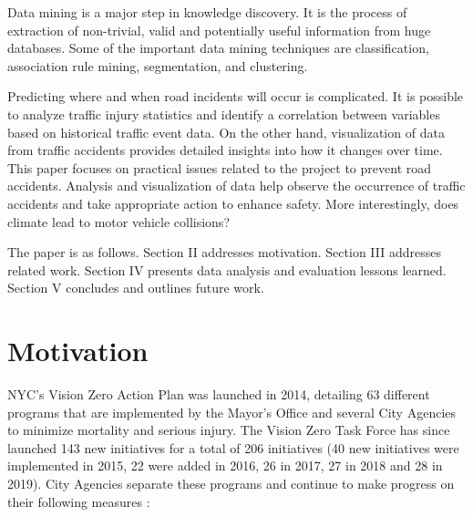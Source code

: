 \documentclass[conference]{IEEEtran}
\begin{document}
Data mining is a major step in knowledge discovery.  It is the process of extraction of non-trivial, valid and potentially useful information from huge databases. Some of the important data mining techniques are classification, association rule mining, segmentation, and clustering. 

Predicting where and when road incidents will occur is complicated. It is possible to analyze traffic injury statistics and identify a correlation between variables based on historical traffic event data. On the other hand, visualization of data from traffic accidents provides detailed insights into how it changes over time. This paper focuses on practical issues related to the project to prevent road accidents. Analysis and visualization of data help observe the occurrence of traffic accidents and take appropriate action to enhance safety.  More interestingly, does climate lead to motor vehicle collisions? 

The paper is as follows. Section II addresses motivation. Section III addresses related work. Section IV presents data analysis and evaluation lessons learned. Section V concludes and outlines future work. 

\section{Motivation}
NYC’s Vision Zero Action Plan was launched in 2014, detailing 63 different programs that are implemented by the Mayor's Office and several City Agencies to minimize mortality and serious injury. The Vision Zero Task Force has since launched 143 new initiatives for a total of 206 initiatives (40 new initiatives were implemented in 2015, 22 were added in 2016, 26 in 2017, 27 in 2018 and 28 in 2019).  City Agencies separate these programs and continue to make progress on their following measures \cite{VisionZeroInitiative}:     
\end{document}
